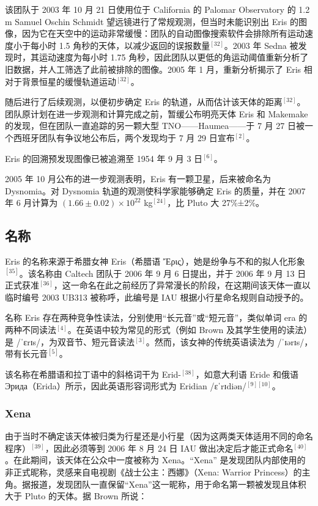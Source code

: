 该团队于 2003 年 10 月 21 日使用位于 California 的 Palomar Observatory 的 1.2 m Samuel Oschin Schmidt 望远镜进行了常规观测，但当时未能识别出 Eris 的图像，因为它在天空中的运动非常缓慢：团队的自动图像搜索软件会排除所有运动速度小于每小时 1.5 角秒的天体，以减少返回的误报数量\(^{[32]}\)。2003 年 Sedna 被发现时，其运动速度为每小时 1.75 角秒，因此团队以更低的角运动阈值重新分析了旧数据，并人工筛选了此前被排除的图像。2005 年 1 月，重新分析揭示了 Eris 相对于背景恒星的缓慢轨道运动\(^{[32]}\)。

随后进行了后续观测，以便初步确定 Eris 的轨道，从而估计该天体的距离\(^{[32]}\)。团队原计划在进一步观测和计算完成之前，暂缓公布明亮天体 Eris 和 Makemake 的发现，但在团队一直追踪的另一颗大型 TNO——Haumea——于 7 月 27 日被一个西班牙团队有争议地公布后，两个发现均于 7 月 29 日宣布\(^{[2]}\)。

Eris 的回溯预发现图像已被追溯至 1954 年 9 月 3 日\(^{[6]}\)。

2005 年 10 月公布的进一步观测表明，Eris 有一颗卫星，后来被命名为 Dysnomia。对 Dysnomia 轨道的观测使科学家能够确定 Eris 的质量，并在 2007 年 6 月计算为 \((1.66\pm0.02)\times10^{22}\) kg\(^{[24]}\)，比 Pluto 大 27\%±2\%。
\subsection{名称}  
Eris 的名称来源于希腊女神 Eris（希腊语 Ἔρις），她是纷争与不和的拟人化形象\(^{[35]}\)。该名称由 Caltech 团队于 2006 年 9 月 6 日提出，并于 2006 年 9 月 13 日正式获准\(^{[36]}\)，这一命名在此之前经历了异常漫长的阶段，在这期间该天体一直以临时编号 2003 UB313 被称呼，此编号是 IAU 根据小行星命名规则自动授予的。

名称 Eris 存在两种竞争性读法，分别使用“长元音”或“短元音”，类似单词 era 的两种不同读法\(^{[4]}\)。在英语中较为常见的形式（例如 Brown 及其学生使用的读法）是 /ˈɛrɪs/，为双音节、短元音读法\(^{[3]}\)。然而，该女神的传统英语读法为 /ˈɪərɪs/，带有长元音\(^{[5]}\)。

该名称在希腊语和拉丁语中的斜格词干为 Erid-\(^{[38]}\)，如意大利语 Eride 和俄语 Эрида（Erida）所示，因此英语形容词形式为 Eridian /ɛˈrɪdiən/\(^{[9][10]}\)。
\subsubsection{Xena}  
由于当时不确定该天体被归类为行星还是小行星（因为这两类天体适用不同的命名程序）\(^{[39]}\)，因此必须等到 2006 年 8 月 24 日 IAU 做出决定后才能正式命名\(^{[40]}\)。在此期间，该天体在公众中一度被称为 Xena。“Xena” 是发现团队内部使用的非正式昵称，灵感来自电视剧《战士公主：西娜》（Xena: Warrior Princess）的主角。据报道，发现团队一直保留“Xena”这一昵称，用于命名第一颗被发现且体积大于 Pluto 的天体。据 Brown 所说：

